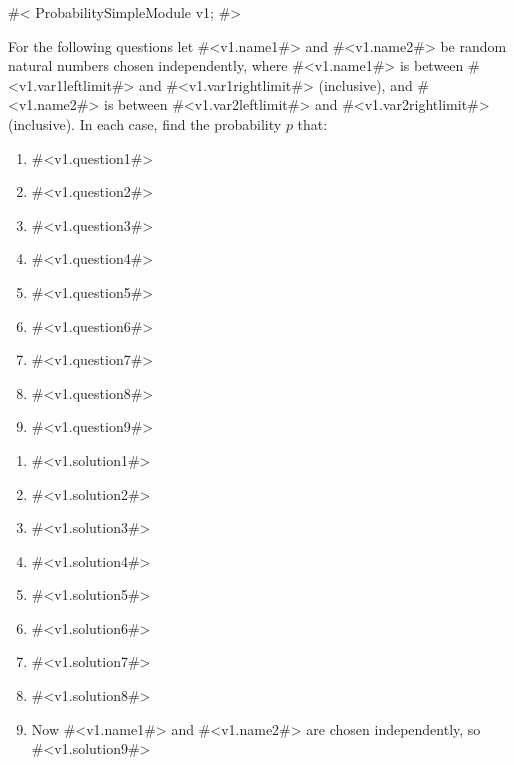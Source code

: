 


#<
ProbabilitySimpleModule v1;
#>


For the following questions let  #<v1.name1#> and #<v1.name2#> be random natural numbers chosen independently, 
where #<v1.name1#> is between #<v1.var1leftlimit#> and #<v1.var1rightlimit#> (inclusive), and #<v1.name2#> is between #<v1.var2leftlimit#> 
and #<v1.var2rightlimit#> (inclusive). In each case, find the probability $p$ that:
\begin{enumerate}
\item
#<v1.question1#> 
\item
#<v1.question2#> 
\item
#<v1.question3#> 
\item
#<v1.question4#> 
\item
#<v1.question5#>
\item
#<v1.question6#>
\item
#<v1.question7#>
\item
#<v1.question8#>
\item
#<v1.question9#>

\end{enumerate}


\begin{enumerate}
\item
#<v1.solution1#> \\
\item
#<v1.solution2#> \\
\item
#<v1.solution3#> \\
\item
#<v1.solution4#> \\
\item
#<v1.solution5#>\\
\item
#<v1.solution6#> \\
\item
#<v1.solution7#> \\
\item
#<v1.solution8#> \\
\item
Now #<v1.name1#> and #<v1.name2#> are chosen independently, so \\[1.5mm]
#<v1.solution9#> 

\end{enumerate}

